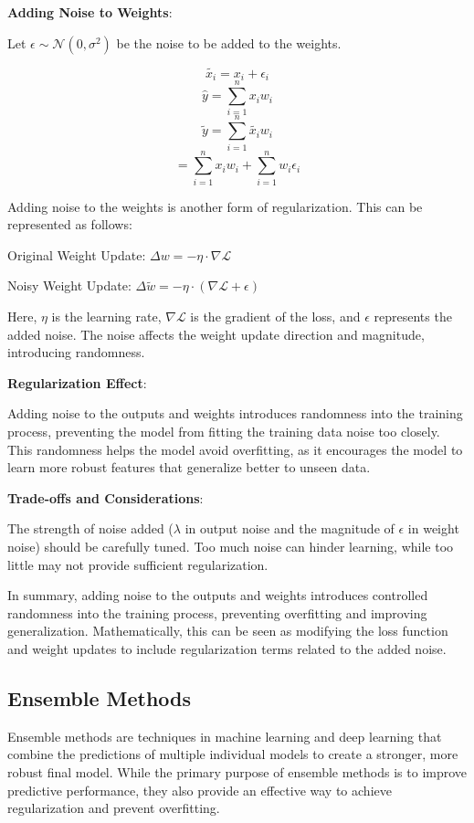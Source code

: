 \documentclass{report}
\begin{document}
\textbf{Adding Noise to Weights}:

Let $\epsilon \sim \mathcal{N}(0, \sigma^2)$ be the noise to be added to the weights.

$$\tilde{x_i} = x_i + \epsilon_i$$
$$\hat{y} = \sum_{i=1}^n x_i w_i$$
$$\tilde{y} = \sum_{i=1}^n\tilde{x_i} w_i$$
$$= \sum_{i=1}^n x_i w_i + \sum_{i=1}^n w_i \epsilon_i$$

Adding noise to the weights is another form of regularization. This can be represented as follows:

Original Weight Update: \( \Delta w = -\eta \cdot \nabla \mathcal{L} \)

Noisy Weight Update: \( \Delta \tilde{w} = -\eta \cdot (\nabla \mathcal{L} + \epsilon) \)

Here, \( \eta \) is the learning rate, \( \nabla \mathcal{L} \) is the gradient of the loss, and \( \epsilon \) represents the added noise. The noise affects the weight update direction and magnitude, introducing randomness.

\textbf{Regularization Effect}:

Adding noise to the outputs and weights introduces randomness into the training process, preventing the model from fitting the training data noise too closely. This randomness helps the model avoid overfitting, as it encourages the model to learn more robust features that generalize better to unseen data.

\textbf{Trade-offs and Considerations}:

The strength of noise added (\( \lambda \) in output noise and the magnitude of \( \epsilon \) in weight noise) should be carefully tuned. Too much noise can hinder learning, while too little may not provide sufficient regularization.

In summary, adding noise to the outputs and weights introduces controlled randomness into the training process, preventing overfitting and improving generalization. Mathematically, this can be seen as modifying the loss function and weight updates to include regularization terms related to the added noise.


\subsection{Ensemble Methods}

Ensemble methods are techniques in machine learning and deep learning that combine the predictions of multiple individual models to create a stronger, more robust final model. While the primary purpose of ensemble methods is to improve predictive performance, they also provide an effective way to achieve regularization and prevent overfitting.
\end{document}
